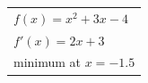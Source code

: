 \documentclass[border=40pt]{standalone}
\begin{document}
\pagecolor[HTML]{2F4F3A}\color[HTML]{EEEEEE}\Huge
\begin{tabular}{l}
$f(x) = x^2 + 3x - 4$ \\[12pt]
$f'(x) = 2x + 3$ \\[12pt]
\color[HTML]{FFE08A}minimum at $x = -1.5$
\end{tabular}
\end{document}
